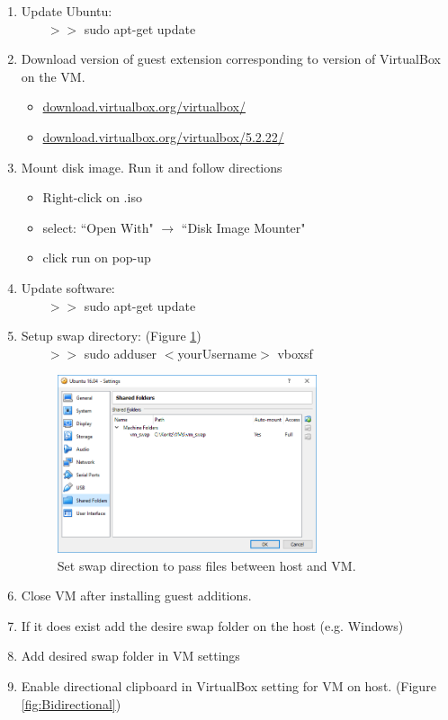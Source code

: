 \documentclass{scrartcl}
\begin{document}
\begin{enumerate}
	\item Update Ubuntu: \\ $\qquad >>$ sudo apt-get update
	\item Download version of guest extension corresponding to version of  VirtualBox on the VM.
	\begin{itemize}
		\item \href{http://download.virtualbox.org/virtualbox/}{download.virtualbox.org/virtualbox/}
		\item \href{http://download.virtualbox.org/virtualbox/5.2.22/}{download.virtualbox.org/virtualbox/5.2.22/}
	\end{itemize}
	\item Mount disk image.  Run it and follow directions
	\begin{itemize}
		\item Right-click on .iso 
		\item select: ``Open With" $\rightarrow$ ``Disk Image Mounter"
		\item click run on pop-up
	\end{itemize}
	\item Update software: \\ $\qquad >>$ sudo apt-get update
	\item Setup swap directory: (Figure \ref{fig:swap}) \\ $\qquad >>$	sudo adduser $<$yourUsername$>$ vboxsf
	
	\begin{figure}[p]
		\centering
		\includegraphics[width=3.0in]{swap.png}
		\caption{Set swap direction to pass files between host and VM.}
		\label{fig:swap}
	\end{figure}

	\item Close VM after installing guest additions.
	\item If it does exist add the desire swap folder on the host (e.g. Windows)
	\item Add desired swap folder in VM settings
	\item Enable directional clipboard in VirtualBox setting for VM on host. (Figure \ref{fig:Bidirectional})
	

\end{enumerate}
\end{document}
